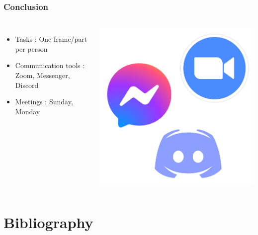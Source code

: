 \documentclass{beamer}
\begin{document}
\begin{frame}
	\frametitle{Conclusion}
	\begin{columns}
		\begin{itemize}
			\item Tasks : One frame/part per person
			\onslide<2->\item Communication tools : Zoom, Messenger, Discord \pause
			\onslide<3->\item Meetings : Sunday, Monday \pause
		\end{itemize}

		\includegraphics[width=1\textwidth]{Images/Tools}
	\end{columns}

\end{frame}


\section{Bibliography}
\end{document}
